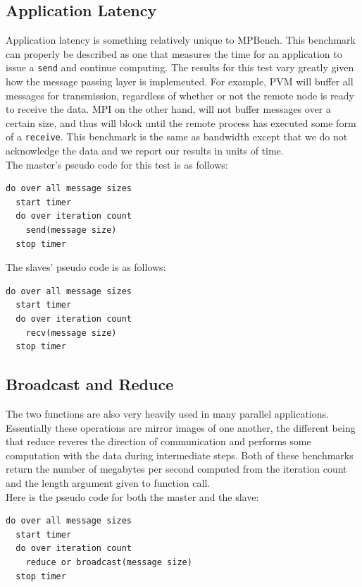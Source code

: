 \documentclass [12pt]{article}
\begin{document}
\subsection{Application Latency}

Application latency is something relatively unique to MPBench. This
benchmark can properly be described as one that measures the time for
an application to issue a {\tt send} and continue computing. The
results for this test vary greatly given how the message passing layer
is implemented. For example, PVM will buffer all messages for
transmission, regardless of whether or not the remote node is ready to
receive the data. MPI on the other hand, will not buffer messages over
a certain size, and thus will block until the remote process has
executed some form of a {\tt receive}. This benchmark is the same as
bandwidth except that we do not acknowledge the data and we report our
results in units of time. \\

The master's pseudo code for this test is as follows:
\begin{verbatim}
do over all message sizes
  start timer
  do over iteration count
    send(message size)
  stop timer
\end{verbatim}

The slaves' pseudo code is as follows:
\begin{verbatim}
do over all message sizes
  start timer
  do over iteration count
    recv(message size)
  stop timer
\end{verbatim}

\subsection{Broadcast and Reduce}

The two functions are also very heavily used in many parallel
applications. Essentially these operations are mirror images of one
another, the different being that reduce reveres the direction of 
communication and performs some computation with the data during
intermediate steps. Both of these benchmarks return the number of
megabytes per second computed from the iteration count and the length
argument given to function call.  \\

Here is the pseudo code for both the master and the slave:
\begin{verbatim}
do over all message sizes
  start timer
  do over iteration count
    reduce or broadcast(message size)
  stop timer
\end{verbatim}
\end{document}
